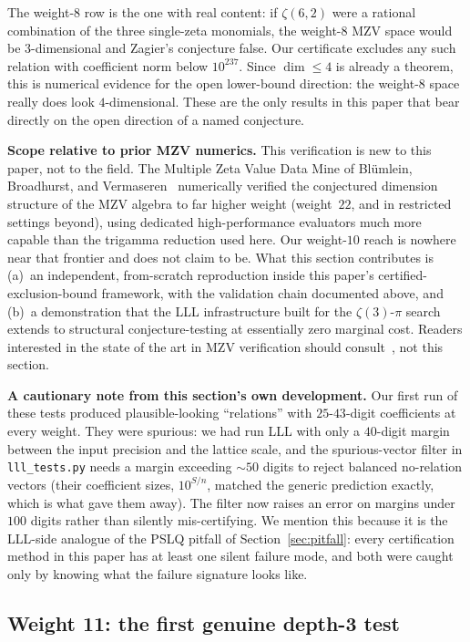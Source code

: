 \documentclass[12pt]{article}
\theoremstyle{definition}
\theoremstyle{remark}
\begin{document}
\noindent The weight-$8$ row is the one with real content: if
$\zeta(6,2)$ were a rational combination of the three single-zeta
monomials, the weight-$8$ MZV space would be $3$-dimensional and
Zagier's conjecture false.  Our certificate excludes any such relation
with coefficient norm below $10^{237}$.  Since $\dim\le 4$ is already
a theorem, this is numerical evidence for the open lower-bound
direction: the weight-$8$ space really does look $4$-dimensional.
These are the only results in this paper that bear directly on the
open direction of a named conjecture.

\textbf{Scope relative to prior MZV numerics.}  This verification is
new to this paper, not to the field.  The Multiple Zeta Value Data
Mine of Bl\"umlein, Broadhurst, and Vermaseren~\cite{BBV2010}
numerically verified the conjectured dimension structure of the MZV
algebra to far higher weight (weight~$22$, and in restricted settings
beyond), using dedicated high-performance evaluators much more
capable than the trigamma reduction used here.  Our weight-$10$ reach
is nowhere near that frontier and does not claim to be.  What this
section contributes is (a)~an independent, from-scratch reproduction
inside this paper's certified-exclusion-bound framework, with the
validation chain documented above, and (b)~a demonstration that the
LLL infrastructure built for the $\zeta(3)$-$\pi$ search extends to
structural conjecture-testing at essentially zero marginal cost.
Readers interested in the state of the art in MZV verification should
consult~\cite{BBV2010}, not this section.

\textbf{A cautionary note from this section's own development.}  Our
first run of these tests produced plausible-looking ``relations'' with
$25$-$43$-digit coefficients at every weight.  They were spurious: we
had run LLL with only a $40$-digit margin between the input precision
and the lattice scale, and the spurious-vector filter in
\texttt{lll\_tests.py} needs a margin exceeding ${\sim}50$ digits to
reject balanced no-relation vectors (their coefficient sizes,
$10^{S/n}$, matched the generic prediction exactly, which is what gave
them away).  The filter now raises an error on margins under $100$
digits rather than silently mis-certifying.  We mention this because
it is the LLL-side analogue of the PSLQ pitfall of
Section~\ref{sec:pitfall}: every certification method in this paper
has at least one silent failure mode, and both were caught only by
knowing what the failure signature looks like.

\subsection{Weight 11: the first genuine depth-3
test}\label{sec:weight11}
\end{document}
